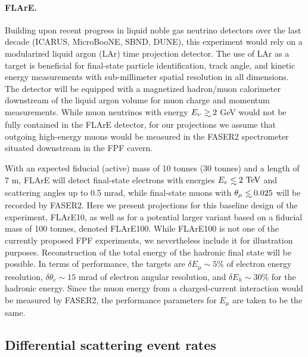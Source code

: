  \paragraph{FLArE.}
 Building upon recent progress in liquid noble gas neutrino detectors over the last decade (ICARUS, MicroBooNE, SBND, DUNE), this experiment
 would rely on a modularized liquid argon (LAr) time projection detector.
 The use of LAr as a target is beneficial for final-state particle identification, track angle, and kinetic energy measurements with sub-millimeter spatial resolution in all dimensions.
 The detector will be equipped with a magnetized hadron/muon calorimeter downstream of the liquid argon volume
 for muon charge and momentum measurements.
 While muon neutrinos with energy $E_\nu \gsim 2$ GeV would not be fully
 contained in the  FLArE detector,
for our projections
we assume that outgoing high-energy
muons would be measured in the FASER2 spectrometer
  situated downstream in the FPF cavern.
 
 With an expected fiducial (active) mass of 10 tonnes (30 tonnes) and a length of 7 m, FLArE will
 detect final-state electrons with energies $E_{e}\lsim 2~\rm{TeV}$ and
 scattering angles up to 0.5 mrad,  while final-state muons
 with $\theta_\mu \lsim 0.025$ will be recorded by FASER2.
 Here we present  projections for this baseline design of the experiment, FLArE10,
 as well as for a potential larger variant based on a fiducial mass of 100 tonnes,
 denoted FLArE100.
 While FLArE100 is not one of the currently proposed FPF experiments, we nevertheless
 include it for illustration purposes.
 Reconstruction of the total energy of the hadronic final state will be
 possible. 
 In terms of performance, the targets
 are $\delta E_\mu \sim5\%$ of electron energy resolution,
 $\delta \theta_e \sim 15$ mrad of electron angular  resolution,
 and $\delta E_h \sim 30$\% for the hadronic energy.
 Since the muon energy from a charged-current interaction would be measured by FASER2, the
 performance parameters for $E_\mu$ are taken to be the same.

\subsection{Differential scattering event rates}
\label{sec:pseudo-data_generation}

